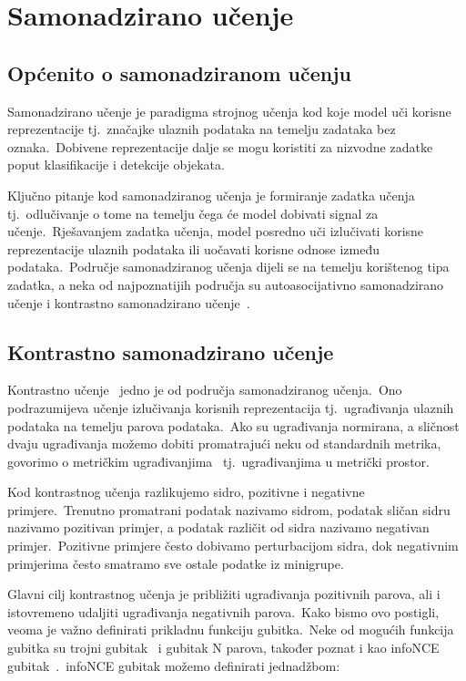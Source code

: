 \documentclass[times, utf8, seminar, numeric]{fer}
\begin{document}
\chapter{Samonadzirano učenje}

\section{Općenito o samonadziranom učenju}

Samonadzirano učenje\cite{liu2021self} je paradigma strojnog učenja kod koje model uči korisne reprezentacije tj.\ značajke ulaznih podataka na temelju zadataka bez oznaka.\ 
Dobivene reprezentacije dalje se mogu koristiti za nizvodne zadatke poput klasifikacije i detekcije objekata.\ 

Ključno pitanje kod samonadziranog učenja je formiranje zadatka učenja tj.\ odlučivanje o tome na temelju čega će model dobivati signal za učenje.\ 
Rješavanjem zadatka učenja, model posredno uči izlučivati korisne reprezentacije ulaznih podataka ili uočavati korisne odnose između podataka.\ 
Područje samonadziranog učenja dijeli se na temelju korištenog tipa zadatka, a neka od najpoznatijih područja su autoasocijativno samonadzirano učenje i kontrastno samonadzirano učenje~\cite{jaiswal2020survey}.\ 

\section{Kontrastno samonadzirano učenje}

Kontrastno učenje~\cite{jaiswal2020survey} jedno je od područja samonadziranog učenja.\ Ono podrazumijeva učenje izlučivanja korisnih reprezentacija tj.\ ugrađivanja ulaznih podataka na temelju parova podataka.\ 
Ako su ugrađivanja normirana, a sličnost dvaju ugrađivanja možemo dobiti promatrajući neku od standardnih metrika, govorimo o metričkim ugrađivanjima~\cite{chavez2001searching} tj.\ ugrađivanjima u metrički prostor.\
  
Kod kontrastnog učenja razlikujemo sidro, pozitivne i negativne primjere.\ Trenutno promatrani podatak nazivamo sidrom, podatak sličan sidru nazivamo pozitivan primjer, a podatak različit od sidra nazivamo negativan primjer.\ 
Pozitivne primjere često dobivamo perturbacijom sidra, dok negativnim primjerima često smatramo sve ostale podatke iz minigrupe.\ 

\pagebreak
  
Glavni cilj kontrastnog učenja je približiti ugrađivanja pozitivnih parova, ali i istovremeno udaljiti ugrađivanja negativnih parova.\ Kako bismo ovo postigli, veoma je važno definirati prikladnu funkciju gubitka.\  
Neke od mogućih funkcija gubitka su trojni gubitak~\cite{schroff2015facenet} i gubitak N parova, također poznat i kao infoNCE gubitak~\cite{oord2018representation}.\ 
infoNCE gubitak možemo definirati jednadžbom: 
\end{document}
